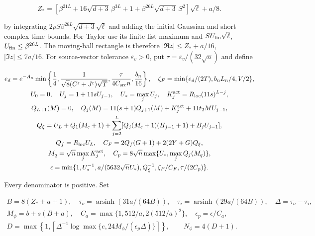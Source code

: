 \[
Z_*=[\beta^{21L}+16\sqrt{d+3}\,\beta^{3L}+1
                 +\beta^{26L}\sqrt{d+3}\,S^2]\sqrt\ell+a/8.
\]

by integrating $2\rho S\beta^{26L}\sqrt{d+3}\sqrt\ell$
and adding the initial Gaussian and short complex-time bounds.
For Taylor use its finite-list maximum and
$SU_{\rm fin}\sqrt\ell$, $U_{\rm fin}\le\beta^{26L}$.
The moving-ball rectangle is therefore
$|\Re z|\le Z_*+a/16$, $|\Im z|\le7a/16$.
For source-vector tolerance $\varepsilon_v>0$, put
$\tau=\varepsilon_v/(32\sqrt n)$ and define

\begin{equation}
\label{cp:init:eq:activation-tolerance}
\begin{gathered}
e_d=e^{-A_n}\min\left\{\frac14,
 \frac1{\sqrt8(C^{\rm r}+J^{\rm r})\sqrt T},
 \frac{\tau}{4C_{\rm src}n},\frac{b_n}{16}\right\},\quad
\zeta_F=\min\{e_d/(2T),b_nL_n/4,V/2\},\\
U_0=0,\quad U_j=1+11sU_{j-1},\quad U_*=\max_jU_j,
 \quad K_j^{\rm act}=R_{\rm loc}(11s)^{L-j},\\
Q_{L+1}(M)=0,\quad
Q_j(M)=11(s+1)Q_{j+1}(M)+K_j^{\rm act}+11t_2MU_{j-1},\\
Q_\xi=U_L+Q_1(M_c+1)
 +\sum_{j=2}^L[Q_j(M_c+1)(H_{j-1}+1)+B_jU_{j-1}],\\
Q_f=R_{\rm loc}U_L,\quad
C_F=2Q_f(G+1)+2(2Y+G)Q_\xi,\\
M_q=\sqrt n\max_jK_j^{\rm act},\quad
C_p=8\sqrt n\max\{U_*,\max_jQ_j(M_q)\},\\
\epsilon=\min\{1,U_*^{-1},a/(5632\sqrt nU_*),Q_\xi^{-1},
                         \zeta_F/C_F,\tau/(2C_p)\}.
\end{gathered}
\end{equation}

Every denominator is positive. Set

\begin{equation}
\label{cp:init:eq:activation-degree}
\begin{gathered}
B=8(Z_*+a+1),\quad
\tau_o=\operatorname{arsinh}(31a/(64B)),\quad
\tau_i=\operatorname{arsinh}(29a/(64B)),\quad\Delta=\tau_o-\tau_i,\\
M_\phi=b+s(B+a),\quad C_a=\max\{1,512/a,2(512/a)^2\},
 \quad\epsilon_p=\epsilon/C_a,\\
D=\max\left\{1,\left\lceil\Delta^{-1}
       \log\max\{e,24M_\phi/(\epsilon_p\Delta)\}\right\rceil\right\},
 \qquad N_\phi=4(D+1).
\end{gathered}
\end{equation}

